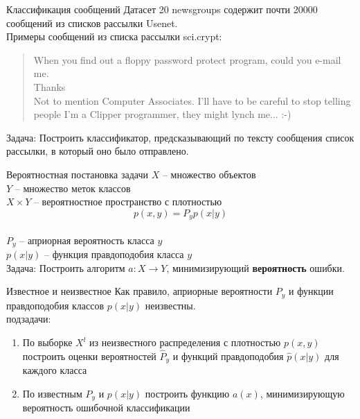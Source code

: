\documentclass[10pt]{beamer}
\begin{document}
{
\begin{frame} {Классификация сообщений}
  Датасет \alert{20 newsgroups} содержит почти 20000 сообщений из списков рассылки Usenet.\\
  \pause
  \bigbreak
  Примеры сообщений из списка рассылки sci.crypt:\\
  \begin{quotation}
    When you find out a floppy password protect program, could you e-mail me.\\
    Thanks\\
    \bigbreak
    Not to mention Computer Associates. I'll have to be careful to stop telling people I'm a Clipper programmer, they might lynch me... :-)
  \end{quotation}
  \pause
  \alert{Задача}: Построить классификатор, предсказывающий по тексту сообщения список рассылки, в который оно было отправлено.
\end{frame}
}

\begin{frame} {Вероятностная постановка задачи}
  $X$ -- множество объектов\\
  $Y$ -- множество меток классов\\
  $X \times Y$ -- вероятностное пространство с плотностью \\
  $$p(x,y) = P_yp(x|y)$$\\
  \bigbreak
  $P_y$ -- априорная вероятность класса $y$\\
  $p(x|y)$ -- функция правдоподобия класса $y$\\
  \bigbreak
  \pause
  \alert{Задача}: Построить алгоритм $a: X \rightarrow Y$, минимизирующий \textbf{вероятность} ошибки.
\end{frame}

\begin{frame}{Известное и неизвестное}
  Как правило, априорные вероятности $P_y$ и функции правдоподобия классов $p(x|y)$ неизвестны.\\
  \pause
   подзадачи:
  \begin{enumerate}
    \item По выборке $X^l$ из неизвестного распределения с плотностью $p(x, y)$ построить оценки вероятностей $\hat{P}_y$ и функций правдоподобия $\hat{p}(x|y)$ для каждого класса
    \item По известным $P_y$ и $p(x|y)$ построить функцию $a(x)$, минимизирующую вероятность ошибочной классификации
  \end{enumerate}
\end{frame}
\end{document}
